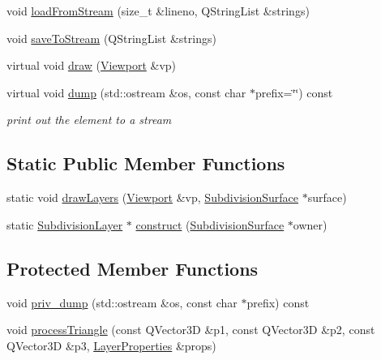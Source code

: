 \begin{DoxyCompactItemize}
\item 
void \hyperlink{classShipCAD_1_1SubdivisionLayer_adf79f2412e399763bf1915d10f2f2a0a}{load\-From\-Stream} (size\-\_\-t \&lineno, Q\-String\-List \&strings)
\item 
void \hyperlink{classShipCAD_1_1SubdivisionLayer_a8bc4a8a9d73a8dd6e48a17a0757d5302}{save\-To\-Stream} (Q\-String\-List \&strings)
\item 
virtual void \hyperlink{classShipCAD_1_1SubdivisionLayer_a86f8600ffbf3973bc31c99bdb9e5b18d}{draw} (\hyperlink{classShipCAD_1_1Viewport}{Viewport} \&vp)
\item 
virtual void \hyperlink{classShipCAD_1_1SubdivisionLayer_ab41e005f720a2bba4b2efa74bfd5943e}{dump} (std\-::ostream \&os, const char $\ast$prefix=\char`\"{}\char`\"{}) const 
\begin{DoxyCompactList}\small\item\em print out the element to a stream \end{DoxyCompactList}\end{DoxyCompactItemize}
\subsection*{Static Public Member Functions}
\begin{DoxyCompactItemize}
\item 
static void \hyperlink{classShipCAD_1_1SubdivisionLayer_a838537201ca31bc92a38585c87eb56e9}{draw\-Layers} (\hyperlink{classShipCAD_1_1Viewport}{Viewport} \&vp, \hyperlink{classShipCAD_1_1SubdivisionSurface}{Subdivision\-Surface} $\ast$surface)
\item 
static \hyperlink{classShipCAD_1_1SubdivisionLayer}{Subdivision\-Layer} $\ast$ \hyperlink{classShipCAD_1_1SubdivisionLayer_a7d41b9d0ff65032014ec52ff846f32a7}{construct} (\hyperlink{classShipCAD_1_1SubdivisionSurface}{Subdivision\-Surface} $\ast$owner)
\end{DoxyCompactItemize}
\subsection*{Protected Member Functions}
\begin{DoxyCompactItemize}
\item 
void \hyperlink{classShipCAD_1_1SubdivisionLayer_a80009b02c31a01e2de9f93d5982b9a63}{priv\-\_\-dump} (std\-::ostream \&os, const char $\ast$prefix) const 
\item 
void \hyperlink{classShipCAD_1_1SubdivisionLayer_abea7581d3e0b740de8db1dfd6bc9bf69}{process\-Triangle} (const Q\-Vector3\-D \&p1, const Q\-Vector3\-D \&p2, const Q\-Vector3\-D \&p3, \hyperlink{structShipCAD_1_1LayerProperties}{Layer\-Properties} \&props)
\end{DoxyCompactItemize}
